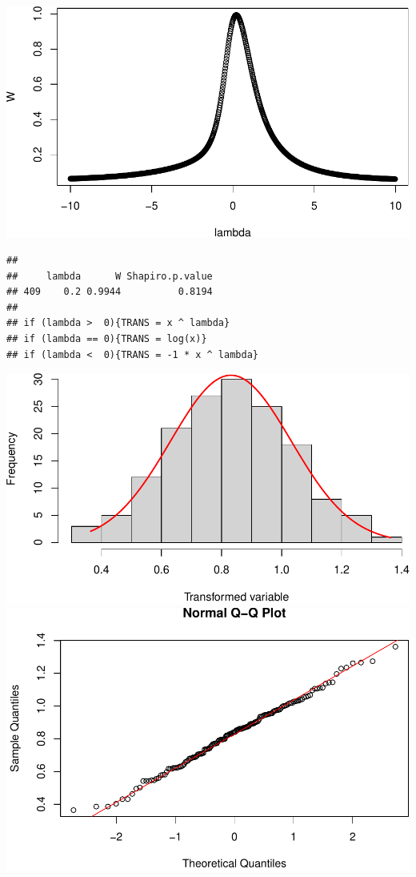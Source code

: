 \documentclass[11pt,]{article}
\begin{document}
\includegraphics{proyecto_files/figure-latex/unnamed-chunk-18-1.pdf}

\begin{verbatim}
## 
##     lambda      W Shapiro.p.value
## 409    0.2 0.9944          0.8194
## 
## if (lambda >  0){TRANS = x ^ lambda} 
## if (lambda == 0){TRANS = log(x)} 
## if (lambda <  0){TRANS = -1 * x ^ lambda}
\end{verbatim}

\includegraphics{proyecto_files/figure-latex/unnamed-chunk-18-2.pdf}
\includegraphics{proyecto_files/figure-latex/unnamed-chunk-18-3.pdf}
\end{document}
